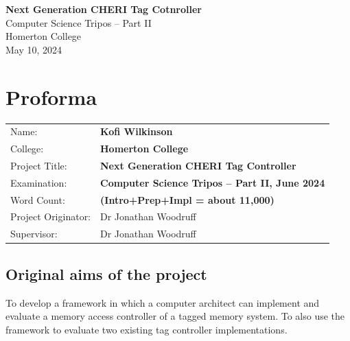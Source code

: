 \documentclass[12pt,a4paper,twoside,openright]{report}
\begin{document}


\pagestyle{empty}


\vspace*{60mm}
\begin{center}
\Huge
\textbf{Next Generation CHERI Tag Cotnroller} \\[5mm]
Computer Science Tripos -- Part II \\[5mm]
Homerton College \\[5mm]
May 10, 2024
\end{center}


\pagestyle{plain}

\chapter*{Proforma}

{\large
\begin{tabular}{ll}
Name:               & \bf Kofi Wilkinson                        \\
College:            & \bf Homerton College                      \\
Project Title:      & \bf Next Generation CHERI Tag Controller  \\
Examination:        & \bf Computer Science Tripos -- Part II, June 2024  \\
Word Count:         & \bf (Intro+Prep+Impl = about 11,000) \footnotemark[1]		\\
Project Originator: & Dr Jonathan Woodruff              \\
Supervisor:         & Dr Jonathan Woodruff              \\
\end{tabular}
}


\section*{Original aims of the project}

To develop a framework in which a computer architect can implement and evaluate
a memory access controller of a tagged memory system. To also use the framework to evaluate two existing
tag controller implementations.
\end{document}
